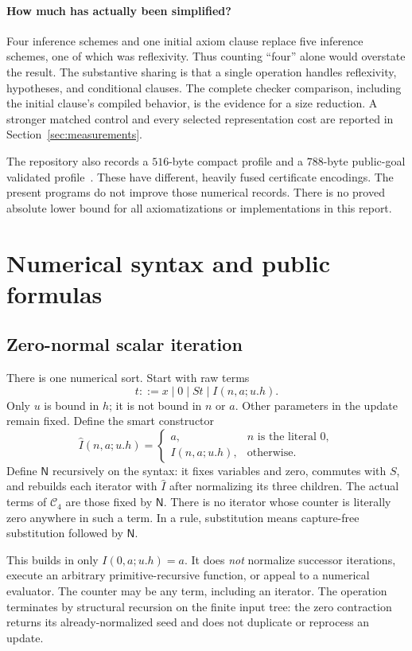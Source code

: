 \documentclass[11pt]{article}
\theoremstyle{definition}
\newcommand{\RC}{\mathcal C_4}
\newcommand{\nf}{\mathsf N}
\begin{document}
\paragraph{How much has actually been simplified?}
Four inference schemes and one initial axiom clause replace five inference
schemes, one of which was reflexivity. Thus counting ``four'' alone would
overstate the result. The substantive sharing is that a single operation
handles reflexivity, hypotheses, and conditional clauses. The complete
checker comparison, including the initial clause's compiled behavior, is
the evidence for a size reduction. A stronger matched control and every
selected representation cost are reported in Section~\ref{sec:measurements}.

The repository also records a $516$-byte compact profile and a $788$-byte
public-goal validated profile~\cite{baseline,compact}. These have different,
heavily fused certificate encodings. The present programs do not improve
those numerical records. There is no proved absolute lower bound for all
axiomatizations or implementations in this report.

\section{Numerical syntax and public formulas}
\label{sec:syntax}

\subsection{Zero-normal scalar iteration}

There is one numerical sort. Start with raw terms
\[
 t ::= x\mid 0\mid St\mid I(n,a;u.h).
\]
Only $u$ is bound in $h$; it is not bound in $n$ or $a$.
Other parameters in the update remain fixed. Define the smart constructor
\[
 \widehat I(n,a;u.h)=
 \begin{cases}a,& n\text{ is the literal }0,\\
 I(n,a;u.h),&\text{otherwise}.
 \end{cases}
\]
Define $\nf$ recursively on the syntax: it fixes variables and zero,
commutes with $S$, and rebuilds each iterator with $\widehat I$ after
normalizing its three children. The actual terms of $\RC$ are those fixed
by $\nf$. There is no iterator whose counter is literally zero anywhere
in such a term. In a rule, substitution means capture-free substitution
followed by $\nf$.

This builds in only $I(0,a;u.h)=a$. It does \emph{not} normalize successor
iterations, execute an arbitrary primitive-recursive function, or appeal to
a numerical evaluator. The counter may be any term, including an iterator.
The operation terminates by structural recursion on the finite input tree:
the zero contraction returns its already-normalized seed and does not
duplicate or reprocess an update.
\end{document}
